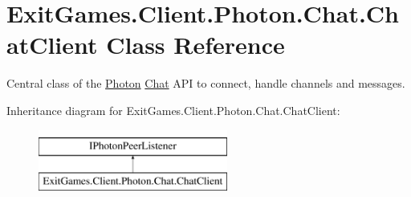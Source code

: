 \hypertarget{class_exit_games_1_1_client_1_1_photon_1_1_chat_1_1_chat_client}{}\section{Exit\+Games.\+Client.\+Photon.\+Chat.\+Chat\+Client Class Reference}
\label{class_exit_games_1_1_client_1_1_photon_1_1_chat_1_1_chat_client}


Central class of the \hyperlink{namespace_exit_games_1_1_client_1_1_photon}{Photon} \hyperlink{namespace_exit_games_1_1_client_1_1_photon_1_1_chat}{Chat} A\+PI to connect, handle channels and messages.  


Inheritance diagram for Exit\+Games.\+Client.\+Photon.\+Chat.\+Chat\+Client\+:\begin{figure}[H]
\begin{center}
\leavevmode
\includegraphics[height=2.000000cm]{class_exit_games_1_1_client_1_1_photon_1_1_chat_1_1_chat_client}
\end{center}
\end{figure}
